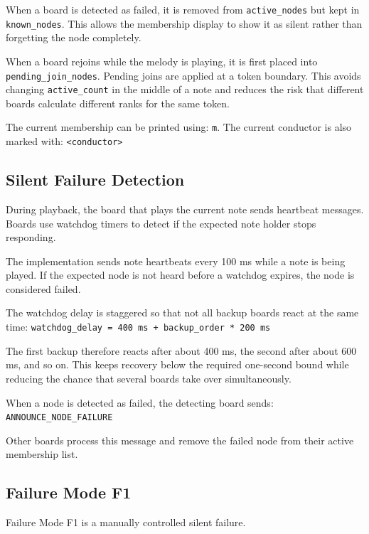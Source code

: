 \documentclass[11pt,a4paper]{article}
\begin{document}
When a board is detected as failed, it is removed from \texttt{active\_\allowbreak{}nodes} but kept in \texttt{known\_\allowbreak{}nodes}. This allows the membership display to show it as silent rather than forgetting the node completely.

When a board rejoins while the melody is playing, it is first placed into \texttt{pending\_\allowbreak{}join\_\allowbreak{}nodes}. Pending joins are applied at a token boundary. This avoids changing \texttt{active\_\allowbreak{}count} in the middle of a note and reduces the risk that different boards calculate different ranks for the same token.

The current membership can be printed using: \texttt{m}. The current conductor is also marked with: \texttt{\textless{}conductor\textgreater{}}

\subsection*{Silent Failure Detection}

During playback, the board that plays the current note sends heartbeat messages. Boards use watchdog timers to detect if the expected note holder stops responding.

The implementation sends note heartbeats every 100 ms while a note is being played. If the expected node is not heard before a watchdog expires, the node is considered failed.

The watchdog delay is staggered so that not all backup boards react at the same time: \texttt{watchdog\_\allowbreak{}delay = 400 ms + backup\_\allowbreak{}order * 200 ms}

The first backup therefore reacts after about 400 ms, the second after about 600 ms, and so on. This keeps recovery below the required one-second bound while reducing the chance that several boards take over simultaneously.

When a node is detected as failed, the detecting board sends: \texttt{ANNOUNCE\_\allowbreak{}NODE\_\allowbreak{}FAILURE}

Other boards process this message and remove the failed node from their active membership list.

\subsection*{Failure Mode F1}

Failure Mode F1 is a manually controlled silent failure.
\end{document}
